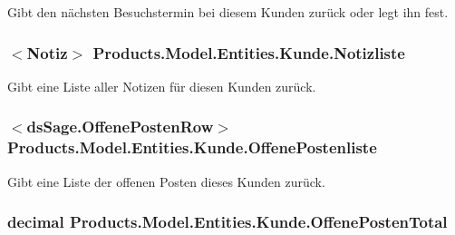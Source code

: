Gibt den nächsten Besuchstermin bei diesem Kunden zurück oder legt ihn fest. 

\subsubsection[{\texorpdfstring{Notizliste}{Notizliste}}]{$<${\bf Notiz}$>$ Products.\+Model.\+Entities.\+Kunde.\+Notizliste\hspace{0.3cm}{\ttfamily [get]}}\hypertarget{class_products_1_1_model_1_1_entities_1_1_kunde_ae73fb69dec119766fc1db0177f1709f7}{}\label{class_products_1_1_model_1_1_entities_1_1_kunde_ae73fb69dec119766fc1db0177f1709f7}


Gibt eine Liste aller Notizen für diesen Kunden zurück. 

\subsubsection[{\texorpdfstring{Offene\+Postenliste}{OffenePostenliste}}]{$<${\bf ds\+Sage.\+Offene\+Posten\+Row}$>$ Products.\+Model.\+Entities.\+Kunde.\+Offene\+Postenliste\hspace{0.3cm}{\ttfamily [get]}}\hypertarget{class_products_1_1_model_1_1_entities_1_1_kunde_a79b3eaa18f4b3b6f27617aa7c655b422}{}\label{class_products_1_1_model_1_1_entities_1_1_kunde_a79b3eaa18f4b3b6f27617aa7c655b422}


Gibt eine Liste der offenen Posten dieses Kunden zurück. 

\subsubsection[{\texorpdfstring{Offene\+Posten\+Total}{OffenePostenTotal}}]{\setlength{\rightskip}{0pt plus 5cm}decimal Products.\+Model.\+Entities.\+Kunde.\+Offene\+Posten\+Total\hspace{0.3cm}{\ttfamily [get]}}\hypertarget{class_products_1_1_model_1_1_entities_1_1_kunde_a742ca8285494d1745293d3f9570392bb}{}\label{class_products_1_1_model_1_1_entities_1_1_kunde_a742ca8285494d1745293d3f9570392bb}


